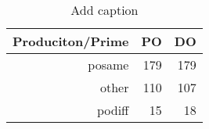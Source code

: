 \begin{table}[htbp]
  \centering
  \caption{Add caption}
    \begin{tabular}{rrr}
    \toprule
    Produciton/Prime & PO    & DO \\
    \midrule
    posame & 179   & 179 \\
    other & 110   & 107 \\
    podiff & 15    & 18 \\
    \bottomrule
    \end{tabular}%
  \label{tab:addlabel}%
\end{table}%
